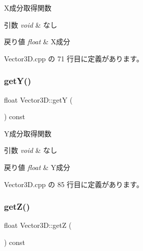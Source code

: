 X成分取得関数 


\begin{DoxyParams}{引数}
{\em void} & なし \\
\hline
\end{DoxyParams}

\begin{DoxyRetVals}{戻り値}
{\em float} & X成分 \\
\hline
\end{DoxyRetVals}


 Vector3\+D.\+cpp の 71 行目に定義があります。

\mbox{\label{class_vector3_d_a1568588ea6695cb2a5680b156f45f961}} 
\subsubsection{\texorpdfstring{get\+Y()}{getY()}}
{\footnotesize\ttfamily float Vector3\+D\+::getY (\begin{DoxyParamCaption}{ }\end{DoxyParamCaption}) const}



Y成分取得関数 


\begin{DoxyParams}{引数}
{\em void} & なし \\
\hline
\end{DoxyParams}

\begin{DoxyRetVals}{戻り値}
{\em float} & Y成分 \\
\hline
\end{DoxyRetVals}


 Vector3\+D.\+cpp の 85 行目に定義があります。

\mbox{\label{class_vector3_d_ab5f2c9a3a82269a8797d2fea70602ede}} 
\subsubsection{\texorpdfstring{get\+Z()}{getZ()}}
{\footnotesize\ttfamily float Vector3\+D\+::getZ (\begin{DoxyParamCaption}{ }\end{DoxyParamCaption}) const}



